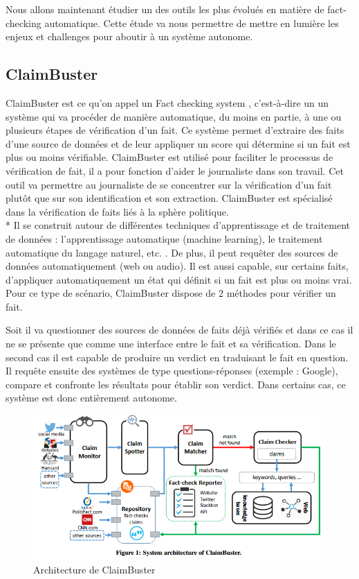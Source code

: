 Nous allons maintenant étudier un des outils les plus évolués en matière de fact-checking automatique. Cette étude va nous permettre de mettre en lumière les enjeux et challenges pour aboutir à un système autonome.

\subsection{ClaimBuster} 

ClaimBuster est ce qu'on appel un Fact checking system \cite{hassan2015quest}, c'est-à-dire un un système qui va procéder de manière automatique, du moins en partie, à une ou plusieurs étapes de vérification d'un fait. Ce système permet d'extraire des faits d'une source de données et de leur appliquer un score qui détermine si un fait est plus ou moins vérifiable. ClaimBuster est utilisé pour faciliter le processus de vérification de fait, il a pour fonction d'aider le journaliste dans son travail. Cet outil va permettre au journaliste de se concentrer sur la vérification d'un fait plutôt que sur son identification et son extraction. ClaimBuster est spécialisé dans la vérification de faits liés à la sphère politique.
\\*
Il se construit autour de différentes techniques d'apprentissage et de traitement de données : l'apprentissage automatique (machine learning), le traitement automatique du langage naturel, etc. \cite{hassan2017claimbuster}.
De plus, il peut requêter des sources de données automatiquement (web ou audio). Il est aussi capable, sur certains faits, d'appliquer automatiquement un état qui définit si un fait est plus ou moins vrai. Pour ce type de scénario, ClaimBuster dispose de 2 méthodes pour vérifier un fait. 

Soit il va questionner des sources de données de faits déjà vérifiés et dans ce cas il ne se présente que comme une interface entre le fait et sa vérification. Dans le second cas il est capable de produire un verdict en traduisant le fait en question. Il requête ensuite des systèmes de type questions-réponses (exemple : Google), compare et confronte les résultats pour établir son verdict. Dans certains cas, ce système est donc entièrement autonome.

\begin{figure}[ht]
\centering
\includegraphics[width=\textwidth, draft=false]{imgs/claimbuster.PNG}
\caption{Architecture de ClaimBuster}
\label{claimbuster}
\end{figure}

